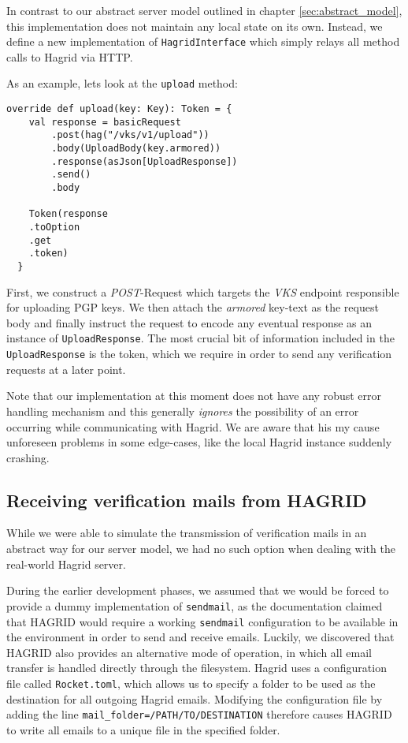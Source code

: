 In contrast to our abstract server model outlined in chapter \ref{sec:abstract_model}, this implementation does not maintain any local state on its own. Instead, we define a new implementation of \texttt{HagridInterface} which simply relays all method calls to Hagrid via HTTP.

As an example, lets look at the \texttt{upload} method: 
\begin{verbatim}
override def upload(key: Key): Token = {
    val response = basicRequest
        .post(hag("/vks/v1/upload"))
        .body(UploadBody(key.armored))
        .response(asJson[UploadResponse])
        .send()
        .body

    Token(response
    .toOption
    .get
    .token)
  }
\end{verbatim}
First, we construct a \emph{POST}-Request which targets the \emph{VKS} endpoint responsible for uploading PGP keys. We then attach the \emph{armored} key-text as the request body and finally instruct the request to encode any eventual response as an instance of \texttt{UploadResponse}.
The most crucial bit of information included in the \texttt{UploadResponse} is the token, which we require in order to send any verification requests at a later point.

Note that our implementation at this moment does not have any robust error handling mechanism and this generally \emph{ignores} the possibility of an error occurring while communicating with Hagrid. We are aware that his my cause unforeseen problems in some edge-cases, like the local Hagrid instance suddenly crashing.

\subsection{Receiving verification mails from HAGRID}
While we were able to simulate the transmission of verification mails in an abstract way for our server model, we had no such option when dealing with the real-world Hagrid server. 

During the  earlier development phases, we assumed that we would be forced to provide a dummy implementation of \texttt{sendmail}, as the documentation claimed that HAGRID would require a working \texttt{sendmail} configuration to be available in the environment in order to send and receive emails.
Luckily, we discovered that HAGRID also provides an alternative mode of operation, in which all email transfer is handled directly through the filesystem.
Hagrid uses a configuration file called \texttt{Rocket.toml}, which allows us to specify a folder to be used as the destination for all outgoing Hagrid emails.   
Modifying the configuration file by adding the line \texttt{mail_folder=/PATH/TO/DESTINATION} therefore causes HAGRID to write all emails to a unique file in the specified folder.

